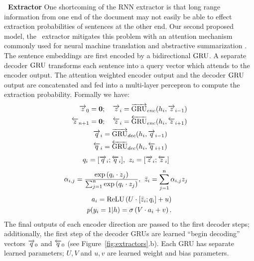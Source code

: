 {\textbf{\sts~Extractor} One shortcoming of the RNN extractor is that long range
information from one end of the document may not easily be able to effect 
extraction probabilities of sentences at the other end. 
Our second proposed model, the \sts~extractor mitigates this problem with an 
attention 
mechanism commonly
used for neural machine translation \cite{bahdanau2014neural} and 
abstractive summarization \cite{see2017get}. 
The sentence embeddings are first
encoded by a bidirectional $\operatorname{GRU}$. A separate decoder $\operatorname{GRU}$ transforms each 
sentence into a query vector which attends to the encoder output. The
attention weighted encoder output and the decoder $\operatorname{GRU}$ output are concatenated
and fed into a multi-layer percepron to compute the extraction probability.
Formally we have:
\begin{align}
    \rEncExtHidden_0 = \textbf{0}&;\quad \rEncExtHidden_i = \rgru_{enc}(\sentEmb[i], \rEncExtHidden_{i-1}) \\
    \lEncExtHidden_{\docSize + 1} = \textbf{0}&;\quad  \lEncExtHidden_i = \lgru_{enc}(\sentEmb[i], \lEncExtHidden_{i+1}) \\
    \rDecExtHidden_i &= \rgru_{dec}(\sentEmb[i], \rDecExtHidden_{i-1}) \\
    \lDecExtHidden_i &= \lgru_{dec}(\sentEmb[i], \lDecExtHidden_{i+1}) 
\end{align}
\begin{align}
 q_i = [\overrightarrow{q}_i; \overleftarrow{q}_i], &\;\;
 z_i = [\overrightarrow{z}_i; \overleftarrow{z}_i] 
\end{align}
\begin{align}
 \alpha_{i,j} = 
   \frac{\exp \left(q_i \cdot z_j \right)}{
   \sum_{j=1}^{n}\exp\left(q_i \cdot z_j\right)}, 
& \;\; \bar{z}_i = \sum_{j=1}^{n} \alpha_{i,j} z_j 
\end{align}
\begin{align}
   \logits_i = \relu\left(U \cdot [\attnExtHidden_i; \decExtHidden_i] + u \right)&\\
   p(\slabel_i=1|\sentvec) = \sigma\left(V\cdot \logits_i + v  \right).
\end{align}
The final outputs of each encoder direction are passed to the first decoder
steps; additionally, the first step of the decoder GRUs are learned 
``begin decoding'' vectors $\overrightarrow{q}_0$ and $\overleftarrow{q}_0$ 
(see Figure~\ref{fig:extractors}.b).
Each GRU has separate learned 
parameters; $U, V$ and $u, v$ are learned weight and bias parameters.


}
